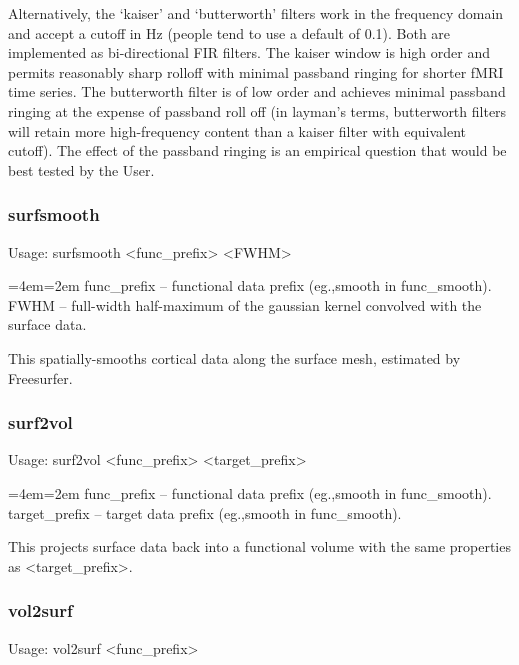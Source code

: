 \documentclass[final,titlepage,letterpaper,oneside,12pt]{article}
\renewcommand{\texttt}[2][BrickRed]{\textcolor{#1}{\ttfamily #2}}%
\newenvironment{blockquote}{%
  \par%
  \medskip
  \leftskip=4em\rightskip=2em%
  \noindent\ignorespaces}{%
  \par\medskip}
\begin{document}
Alternatively, the `kaiser' and `butterworth' filters work in the frequency domain and accept a cutoff in Hz (people tend to use a default of 0.1). Both are implemented as bi-directional FIR filters. The kaiser window is high order and permits reasonably sharp rolloff with minimal passband ringing for shorter fMRI time series. The butterworth filter is of low order and achieves minimal passband ringing at the expense of passband roll off (in layman's terms, butterworth filters will retain more high-frequency content than a kaiser filter with equivalent cutoff). The effect of the passband ringing is an empirical question that would be best tested by the User.

\subsubsection{surfsmooth}
Usage: \texttt{surfsmooth <func\_prefix> <FWHM>}

\begin{blockquote}
func\_prefix -- functional data prefix (eg.,smooth in func\_smooth). \\
FWHM -- full-width half-maximum of the gaussian kernel convolved with the surface data. \
\end{blockquote}

\noindent This spatially-smooths cortical data along the surface mesh, estimated by Freesurfer.

\subsubsection{surf2vol}
Usage: \texttt{surf2vol <func\_prefix> <target\_prefix>}

\begin{blockquote}
func\_prefix -- functional data prefix (eg.,smooth in func\_smooth). \\
target\_prefix -- target data prefix (eg.,smooth in func\_smooth). \
\end{blockquote}

\noindent This projects surface data back into a functional volume with the same properties as <target\_prefix>.

\subsubsection{vol2surf}
Usage: \texttt{vol2surf <func\_prefix>}
\end{document}
